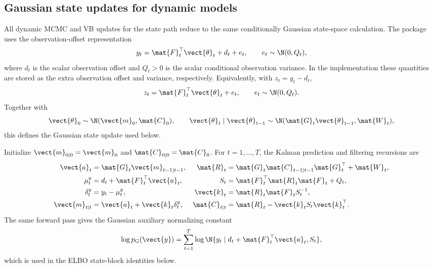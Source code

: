 \subsection{Gaussian state updates for dynamic models}
\label{sec:gaussian_state_update}

All dynamic MCMC and VB updates for the state path reduce to the same
conditionally Gaussian state-space calculation. The package uses the
observation-offset representation
\begin{equation}
y_t=\mat{F}_t^\top\vect{\theta}_t+d_t+e_t,\qquad
e_t\sim\N(0,Q_t),
\label{eq:generic_gaussian_obs}
\end{equation}
where $d_t$ is the scalar observation offset and $Q_t>0$ is the scalar
conditional observation variance. In the implementation these quantities are
stored as the extra observation offset and variance, respectively. Equivalently,
with $z_t=y_t-d_t$,
\[
z_t=\mat{F}_t^\top\vect{\theta}_t+e_t,\qquad e_t\sim\N(0,Q_t).
\]
Together with
\[
\vect{\theta}_0\sim\N(\vect{m}_0,\mat{C}_0),\qquad
\vect{\theta}_t\mid\vect{\theta}_{t-1}
\sim
\N(\mat{G}_t\vect{\theta}_{t-1},\mat{W}_t),
\]
this defines the Gaussian state update used below.

Initialize $\vect{m}_{0|0}=\vect{m}_0$ and
$\mat{C}_{0|0}=\mat{C}_0$. For $t=1,\ldots,T$, the Kalman prediction and
filtering recursions are
\begin{align}
\vect{a}_t
&=\mat{G}_t\vect{m}_{t-1|t-1},&
\mat{R}_t
&=\mat{G}_t\mat{C}_{t-1|t-1}\mat{G}_t^\top+\mat{W}_t,
\label{eq:generic_kalman_prediction}\\
\mu_t^y
&=d_t+\mat{F}_t^\top\vect{a}_t,&
S_t
&=\mat{F}_t^\top\mat{R}_t\mat{F}_t+Q_t,
\label{eq:generic_kalman_forecast}\\
\delta_t^y
&=y_t-\mu_t^y,&
\vect{k}_t
&=\mat{R}_t\mat{F}_tS_t^{-1},
\label{eq:generic_kalman_gain}\\
\vect{m}_{t|t}
&=\vect{a}_t+\vect{k}_t\delta_t^y,&
\mat{C}_{t|t}
&=\mat{R}_t-\vect{k}_tS_t\vect{k}_t^\top.
\label{eq:generic_kalman_filter}
\end{align}
The same forward pass gives the Gaussian auxiliary normalizing constant
\begin{equation}
\log p_{\mathrm{G}}(\vect{y})
=
\sum_{t=1}^T
\log \N\{y_t\mid d_t+\mat{F}_t^\top\vect{a}_t,S_t\},
\label{eq:generic_kalman_loglik}
\end{equation}
which is used in the ELBO state-block identities below.

